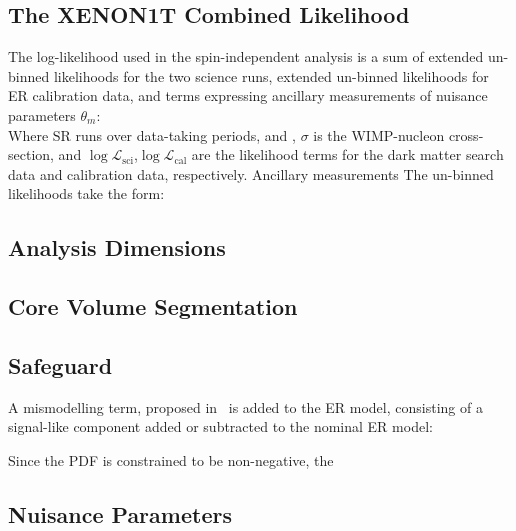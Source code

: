 \newcommand{\lagr}{\mathcal{L}} %
\newcommand{\LL}{\log \mathcal{L}} %
\newcommand{\sr}{\mathrm{SR}}
\newcommand{\nuis}{\theta}
\newcommand{\nuiss}{\vec{\nuis}}
\newcommand{\Pois}[2]{\mathrm{Pois}(#1 | #2)}
\newcommand{\Gaus}[3]{\mathrm{Gaus}(#1 | #2,#3)}
\newcommand{\Uniform}[3]{\mathrm{Uniform}(#1 | #2,#3)}


\subsection{The XENON1T Combined Likelihood}
The log-likelihood used in the spin-independent analysis is a sum of extended un-binned likelihoods for the two science runs, extended un-binned likelihoods for ER calibration data, and terms expressing ancillary measurements of nuisance parameters $\nuis_m$: 
\\
Where $\sr$ runs over data-taking periods, \SRzero and \SRone, $\sigma$ is the WIMP-nucleon cross-section, and $\LL_\mathrm{sci}$,$\LL_\mathrm{cal}$ are the likelihood terms for the dark matter search data and \rnzero calibration data, respectively. Ancillary measurements  The un-binned likelihoods take the form: 

\subsection{Analysis Dimensions}
\subsection{Core Volume Segmentation}

\subsection{Safeguard}
A mismodelling term, proposed in~\cite{safeguard} is added to the ER model, consisting of a signal-like component added or subtracted to the nominal ER model: 


Since the PDF is constrained to be non-negative, the 


\subsection{Nuisance Parameters}


